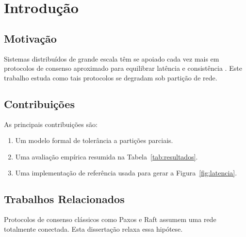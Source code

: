 \chapter{Introdu\c{c}\~ao}
\label{ch:introducao}

\section{Motiva\c{c}\~ao}

Sistemas distribu\'idos de grande escala t\^em se apoiado cada vez mais
em protocolos de consenso aproximado para equilibrar lat\^encia e
consist\^encia \cite{lamport1998part}. Este trabalho estuda como tais
protocolos se degradam sob parti\c{c}\~ao de rede.

\section{Contribui\c{c}\~oes}

As principais contribui\c{c}\~oes s\~ao:

\begin{enumerate}
  \item Um modelo formal de toler\^ancia a parti\c{c}\~oes parciais.
  \item Uma avalia\c{c}\~ao emp\'irica resumida na Tabela~\ref{tab:resultados}.
  \item Uma implementa\c{c}\~ao de refer\^encia usada para gerar a
    Figura~\ref{fig:latencia}.
\end{enumerate}

\section{Trabalhos Relacionados}

Protocolos de consenso cl\'assicos como Paxos \cite{lamport1998part} e
Raft \cite{ongaro2014search} assumem uma rede totalmente conectada.
Esta disserta\c{c}\~ao relaxa essa hip\'otese.
